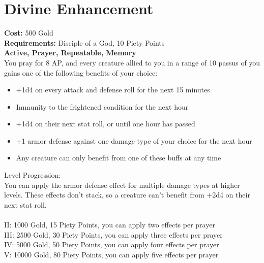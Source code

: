 \section*{Divine Enhancement}
\textbf{Cost:} 500 Gold\\
\textbf{Requirements:} Disciple of a God, 10 Piety Points \\
\textbf{Active, Prayer, Repeatable, Memory}\\
You pray for 8 AP, and every creature allied to you in a range of 10 passus of you gains one of the following benefits of your choice:
\begin{itemize}
	\item +1d4 on every attack and defense roll for the next 15 minutes
	\item Immunity to the frightened condition for the next hour
	\item +1d4 on their next stat roll, or until one hour has passed
	\item +1 armor defense against one damage type of your choice for the next hour
	\item Any creature can only benefit from one of these buffs at any time
\end{itemize}

Level Progression:\\
You can apply the armor defense effect for multiple damage types at higher levels. These effects don't stack, so a creature can't benefit from +2d4 on their next stat roll.\\
\\
II: 1000 Gold, 15 Piety Points, you can apply two effects per prayer\\
III: 2500 Gold, 30 Piety Points, you can apply three effects per prayer\\
IV: 5000 Gold, 50 Piety Points, you can apply four effects per prayer\\
V: 10000 Gold, 80 Piety Points, you can apply five effects per prayer\\